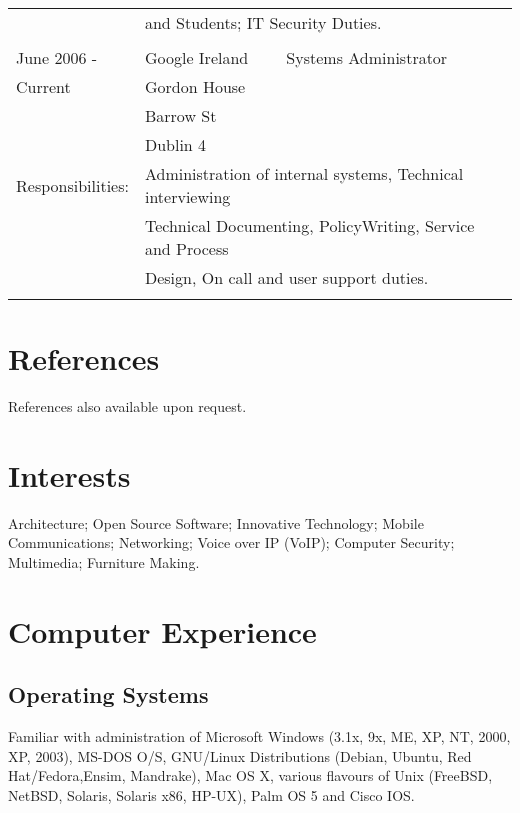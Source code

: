 \documentclass[a4paper, 11pt] {article}
\begin{document}
\begin{tabular}{llll}
						& \multicolumn{3}{l}{and Students; IT Security Duties.} 	\\
						& 									&	&	\\
June 2006 - 		&	Google Ireland	&	 Systems Administrator		&	\hspace{10mm}	\\
Current  			&	Gordon House	&              &            			\\
      				&	Barrow St		&              &            			\\
      				&	Dublin 4			&              &            			\\
Responsibilities:	& \multicolumn{3}{l}{Administration of internal systems, Technical interviewing} 	\\
						& \multicolumn{3}{l}{Technical Documenting, PolicyWriting, Service and Process}		\\ 
						& \multicolumn{3}{l}{Design, On call and user support duties.} 	\\
      				&              						&  &	\\
\end{tabular}

\section*{References}

References also available upon request.

\section*{Interests}

Architecture; Open Source Software; Innovative Technology; 
Mobile Communications;  Networking; Voice over IP (VoIP); 
Computer Security; Multimedia; Furniture Making.

\section*{Computer Experience}

\subsection*{Operating Systems}

Familiar with administration of Microsoft Windows (3.1x, 9x, 
ME, XP, NT, 2000, XP, 2003), MS-DOS O/S, GNU/Linux Distributions 
(Debian, Ubuntu, Red Hat/Fedora,Ensim, Mandrake), Mac OS X, various
flavours of Unix (FreeBSD, NetBSD, Solaris, Solaris x86, HP-UX), 
Palm OS 5 and Cisco IOS.
\end{document}
